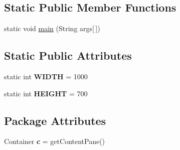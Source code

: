\subsection*{Static Public Member Functions}
\begin{DoxyCompactItemize}
\item 
static void \hyperlink{classbrick_breaker_1_1_start_a1c5523121a86c315e8487d3dc826500c}{main} (String args\mbox{[}$\,$\mbox{]})
\end{DoxyCompactItemize}
\subsection*{Static Public Attributes}
\begin{DoxyCompactItemize}
\item 
\hypertarget{classbrick_breaker_1_1_start_a0cb22b25bc82b86148838e67d553453a}{
static int {\bfseries WIDTH} = 1000}
\label{classbrick_breaker_1_1_start_a0cb22b25bc82b86148838e67d553453a}

\item 
\hypertarget{classbrick_breaker_1_1_start_a06e396be377a68ab41caabfe45ba0951}{
static int {\bfseries HEIGHT} = 700}
\label{classbrick_breaker_1_1_start_a06e396be377a68ab41caabfe45ba0951}

\end{DoxyCompactItemize}
\subsection*{Package Attributes}
\begin{DoxyCompactItemize}
\item 
\hypertarget{classbrick_breaker_1_1_start_aa694e353f91972cfe69ffb36d09cdab9}{
Container {\bfseries c} = getContentPane()}
\label{classbrick_breaker_1_1_start_aa694e353f91972cfe69ffb36d09cdab9}

\end{DoxyCompactItemize}


